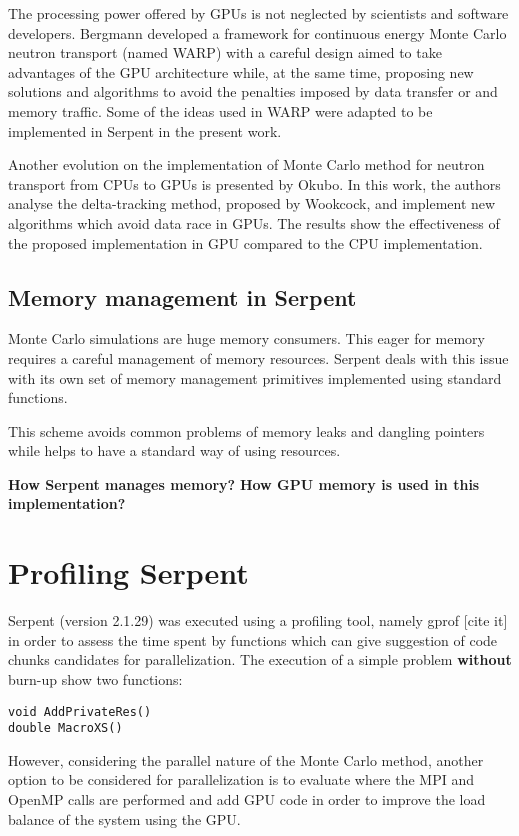 \documentclass[twoside,a4paper,12pt,english,draft]{anstrans}
\begin{document}
The processing power offered by GPUs is not neglected by scientists and software developers.
Bergmann\cite{Bergmann2014} developed a framework for continuous energy Monte Carlo neutron
transport (named WARP) with a careful design aimed to take advantages of the GPU architecture while, at the
same time, proposing new solutions and algorithms to avoid the penalties imposed by data transfer
or and memory traffic. Some of the ideas used in WARP were adapted to be implemented in Serpent in
the present work.

Another evolution on the implementation of Monte Carlo method for neutron transport from CPUs to GPUs
is presented by Okubo\cite{Okubo2016}. In this work, the authors analyse the delta-tracking method,
proposed by Wookcock\cite{Woodcock1965}, and implement new algorithms which avoid data race in
GPUs. The results show the effectiveness of the proposed implementation in GPU compared to the CPU
implementation.


\subsection{Memory management in Serpent}

Monte Carlo simulations are huge memory consumers. This eager for memory requires a careful
management of memory resources. Serpent deals with this issue with its own set of memory
management primitives implemented using standard functions.

This scheme avoids common problems of memory leaks and dangling pointers while helps to
have a standard way of using resources.

\textbf{How Serpent manages memory?}
\textbf{How GPU memory is used in this implementation?}


\section{Profiling Serpent}

Serpent (version 2.1.29) was executed using a profiling tool, namely gprof [cite it] in order
to assess the time spent by functions which can give suggestion of code chunks candidates for
parallelization. The execution of a simple problem \textbf{without} burn-up show two functions:
\begin{verbatim}
void AddPrivateRes()
double MacroXS()
\end{verbatim}
However, considering the parallel nature of the Monte Carlo method, another option to be considered
for parallelization is to evaluate where the MPI and OpenMP calls are performed and add GPU code
in order to improve the load balance of the system using the GPU.
\end{document}
